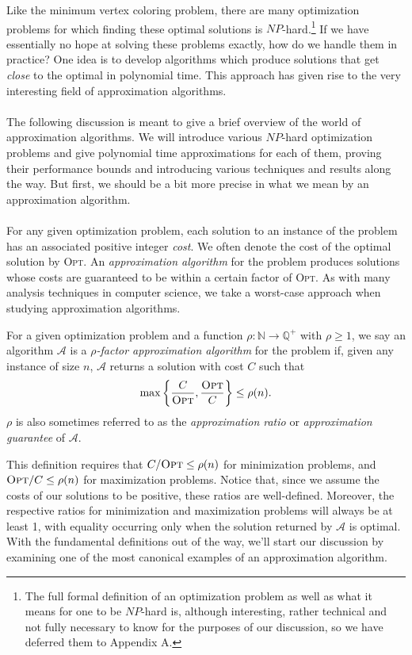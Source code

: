 \documentclass{article}
\newcommand{\N}{\mathbb{N}}
\newcommand{\Q}{\mathbb{Q}}
\newenvironment{definition}[2][Definition]{\begin{trivlist}
\item[\hskip \labelsep {\bfseries #1}\hskip \labelsep {\hspace{-1ex}\bfseries #2.}]}{\end{trivlist}}
\begin{document}
\noindent Like the minimum vertex coloring problem, there are many optimization problems for which finding these optimal solutions is $NP$-hard.\footnote{The full formal definition of an optimization problem as well as what it means for one to be $NP$-hard is, although interesting, rather technical and not fully necessary to know for the purposes of our discussion, so we have deferred them to Appendix A.} If we have essentially no hope at solving these problems exactly, how do we handle them in practice? One idea is to develop algorithms which produce solutions that get \textit{close} to the optimal in polynomial time. This approach has given rise to the very interesting field of approximation algorithms.\\
\\
\noindent The following discussion is meant to give a brief overview of the world of approximation algorithms. We will introduce various $NP$-hard optimization problems and give polynomial time approximations for each of them, proving their performance bounds and introducing various techniques and results along the way. But first, we should be a bit more precise in what we mean by an approximation algorithm.\\
\\
\noindent For any given optimization problem, each solution to an instance of the problem has an associated positive integer \textit{cost}. We often denote the cost of the optimal solution by \textsc{Opt}. An \textit{approximation algorithm} for the problem produces solutions whose costs are guaranteed to be within a certain factor of \textsc{Opt}. As with many analysis techniques in computer science, we take a worst-case approach when studying approximation algorithms.

\begin{definition}{ (Approximation Algorithm)}{}
    For a given optimization problem and a function $\rho: \N \to \Q^+$ with $\rho \geq 1$, we say an algorithm $\mathcal{A}$ is a \textit{$\rho$-factor approximation algorithm} for the problem if, given any instance of size $n$, $\mathcal{A}$ returns a solution with cost $C$ such that
    \[
    \max \bigg\{ \frac{C}{\textsc{Opt}}, \frac{\textsc{Opt}}{C} \bigg\} \leq \rho(n).
    \]
    $\rho$ is also sometimes referred to as the \textit{approximation ratio} or \textit{approximation guarantee} of $\mathcal{A}$.
\end{definition}

\noindent This definition requires that $C/\textsc{Opt} \leq \rho(n)$ for minimization problems, and $\textsc{Opt}/C \leq \rho(n)$ for maximization problems. Notice that, since we assume the costs of our solutions to be positive, these ratios are well-defined. Moreover, the respective ratios for minimization and maximization problems will always be at least 1, with equality occurring only when the solution returned by $\mathcal{A}$ is optimal. With the fundamental definitions out of the way, we'll start our discussion by examining one of the most canonical examples of an approximation algorithm.
\end{document}
